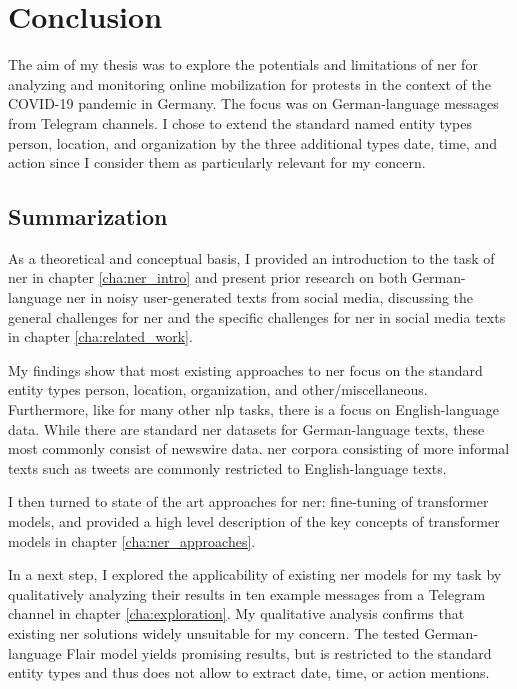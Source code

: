 \chapter{Conclusion}
\label{cha:conclusion}

The aim of my thesis was to explore the potentials and limitations of \gls{ner} for analyzing and monitoring online mobilization for protests in the context of the COVID-19 pandemic in Germany. The focus was on German-language messages from Telegram channels. I chose to extend the standard named entity types person, location, and organization by the three additional types date, time, and action since I consider them as particularly relevant for my concern. 

\section{Summarization}
As a theoretical and conceptual basis, I provided an introduction to the task of \gls{ner} in chapter \ref{cha:ner_intro} and present prior research on both German-language \gls{ner} in noisy user-generated texts from social media, discussing the general challenges for \gls{ner} and the specific challenges for \gls{ner} in social media texts in chapter \ref{cha:related_work}.

My findings show that most existing approaches to \gls{ner} focus on the standard entity types person, location, organization, and other/miscellaneous. Furthermore, like for many other \gls{nlp} tasks, there is a focus on English-language data. While there are standard \gls{ner} datasets for German-language texts, these most commonly consist of newswire data. \gls{ner} corpora consisting of more informal texts such as tweets are commonly restricted to English-language texts. 

I then turned to state of the art approaches for \gls{ner}: fine-tuning of transformer models, and provided a high level description of the key concepts of transformer models in chapter \ref{cha:ner_approaches}.

In a next step, I explored the applicability of existing \gls{ner} models for my task by qualitatively analyzing their results in ten example messages from a Telegram channel in chapter \ref{cha:exploration}. My qualitative analysis confirms that existing \gls{ner} solutions widely unsuitable for my concern. The tested German-language Flair model yields promising results, but is restricted to the standard entity types and thus does not allow to extract date, time, or action mentions.

